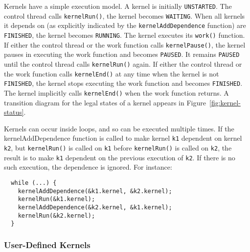 

\begin{figure}[t]
\end{figure}

Kernels have a simple execution model. A kernel is initially {\tt UNSTARTED}. 
The control thread calls {\tt kernelRun()}, the kernel becomes {\tt WAITING}. When all kernels it depends on (as explicitly indicated by 
the {\tt kernelAddDependence} function) are {\tt FINISHED}, the kernel becomes {\tt RUNNING}. The kernel executes its {\tt work()} function. 
If either the control thread or the work function calls {\tt kernelPause()}, the kernel pauses in executing the work function and becomes {\tt PAUSED}. It remains {\tt PAUSED} until the control thread calls {\tt kernelRun()} again. If either the control thread or the work function calls {\tt kernelEnd()} at any time when the kernel is not {\tt FINISHED}, the kernel stops executing the work function and becomes {\tt FINISHED}. The kernel implicitly calls {\tt kernelEnd()} when the work function returns. A transition diagram for the legal states of a kernel appears in Figure~\ref{fig:kernel-status}.

Kernels can occur inside loops, and so can be executed multiple times. If the kernelAddDependence function is called to make kernel {\tt k1} dependent on kernel {\tt k2}, but {\tt kernelRun()} is called on {\tt k1} before {\tt kernelRun()} is called on {\tt k2}, the result is to make {\tt k1} dependent on the previous execution of {\tt k2}. If there is no such execution, the dependence is ignored. For instance:

{\small
\begin{verbatim}
  while (...) {
    kernelAddDependence(&k1.kernel, &k2.kernel);
    kernelRun(&k1.kernel);
    kernelAddDependence(&k2.kernel, &k1.kernel);
    kernelRun(&k2.kernel);
  }
\end{verbatim}}

\subsubsection{User-Defined Kernels}
\label{sec:kernelhlc}

